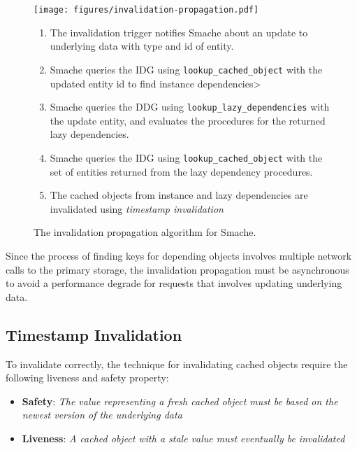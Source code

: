 \begin{figure*}[ht!]
  \centering
  \texttt{[image: figures/invalidation-propagation.pdf]}
  \begin{enumerate}
    \item The invalidation trigger notifies Smache about an update to underlying data with type and id of entity.
    \item Smache queries the IDG using \verb$lookup_cached_object$ with the updated entity id to find instance dependencies>
    \item Smache queries the DDG using \verb$lookup_lazy_dependencies$ with the update entity, and evaluates the procedures for the returned lazy dependencies.
    \item Smache queries the IDG using \verb$lookup_cached_object$ with the set of entities returned from the lazy dependency procedures.
    \item The cached objects from instance and lazy dependencies are invalidated using \emph{timestamp invalidation}
  \end{enumerate}
  \caption{The invalidation propagation algorithm for Smache.}
  \label{fig:invalidation-propagation}
\end{figure*}

Since the process of finding keys for depending objects involves multiple network calls to the primary storage, the invalidation propagation must be asynchronous to avoid a performance degrade for requests that involves updating underlying data.


\subsection{Timestamp Invalidation}
\label{subsec:timestamp-invalidation}

To invalidate correctly, the technique for invalidating cached objects require the following liveness and safety property:

\begin{itemize}
  \item \textbf{Safety}: \emph{The value representing a fresh cached object must be based on the newest version of the underlying data}
  \item \textbf{Liveness}: \emph{A cached object with a stale value must eventually be invalidated}
\end{itemize}


